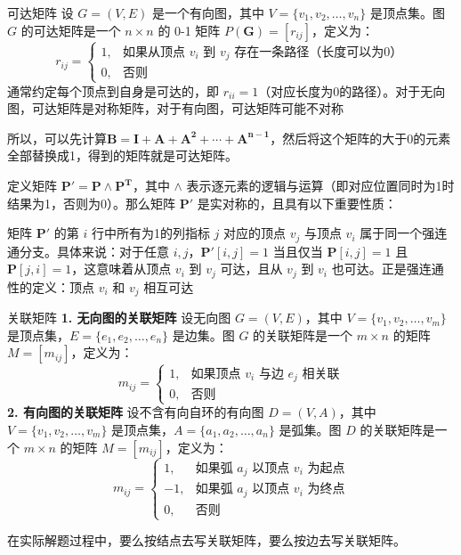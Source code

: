 \begin{definition}{可达矩阵}{}
设 $G = (V, E)$ 是一个有向图，其中 $V = \{v_1, v_2, \ldots, v_n\}$ 是顶点集。图 $G$ 的可达矩阵是一个 $n \times n$ 的 0-1 矩阵 $P(\bm{G}) = [r_{ij}]$，定义为：
\[
r_{ij} = 
\begin{cases}
1, & \text{如果从顶点 } v_i \text{ 到 } v_j \text{ 存在一条路径（长度可以为0）} \\
0, & \text{否则}
\end{cases}
\]
通常约定每个顶点到自身是可达的，即 $r_{ii} = 1$（对应长度为0的路径）。对于无向图，可达矩阵是对称矩阵，对于有向图，可达矩阵可能不对称
\end{definition}
所以，可以先计算$\bm{B}=\bm{I}+\bm{A}+\bm{A^2}+\cdots+\bm{A^{n-1}}$，然后将这个矩阵的大于0的元素全部替换成1，得到的矩阵就是可达矩阵。

定义矩阵 $\bm{P'} = \bm{P} \land \bm{P^T}$，其中 $\land$ 表示逐元素的逻辑与运算（即对应位置同时为1时结果为1，否则为0）。那么矩阵 $\bm{P'}$ 是实对称的，且具有以下重要性质：

矩阵 $\bm{P'}$ 的第 $i$ 行中所有为1的列指标 $j$ 对应的顶点 $v_j$ 与顶点 $v_i$ 属于同一个强连通分支。具体来说：对于任意 $i,j$，$\bm{P'}[i,j] = 1$ 当且仅当 $\bm{P}[i,j] = 1$ 且 $\bm{P}[j,i] = 1$，这意味着从顶点 $v_i$ 到 $v_j$ 可达，且从 $v_j$ 到 $v_i$ 也可达。正是强连通性的定义：顶点 $v_i$ 和 $v_j$ 相互可达

\begin{definition}{关联矩阵}{}
\textbf{1. 无向图的关联矩阵}
设无向图 $G = (V, E)$，其中 $V = \{v_1, v_2, \ldots, v_m\}$ 是顶点集，$E = \{e_1, e_2, \ldots, e_n\}$ 是边集。图 $G$ 的关联矩阵是一个 $m \times n$ 的矩阵 $M = [m_{ij}]$，定义为：
\[
m_{ij} = 
\begin{cases}
1, & \text{如果顶点 } v_i \text{ 与边 } e_j \text{ 相关联} \\
0, & \text{否则}
\end{cases}
\]
\textbf{2. 有向图的关联矩阵}
设不含有向自环的有向图 $D = (V, A)$，其中 $V = \{v_1, v_2, \ldots, v_m\}$ 是顶点集，$A = \{a_1, a_2, \ldots, a_n\}$ 是弧集。图 $D$ 的关联矩阵是一个 $m \times n$ 的矩阵 $M = [m_{ij}]$，定义为：
\[
m_{ij} = 
\begin{cases}
1, & \text{如果弧 } a_j \text{ 以顶点 } v_i \text{ 为起点} \\
-1, & \text{如果弧 } a_j \text{ 以顶点 } v_i \text{ 为终点} \\
0, & \text{否则}
\end{cases}
\]
\end{definition}
在实际解题过程中，要么按结点去写关联矩阵，要么按边去写关联矩阵。

